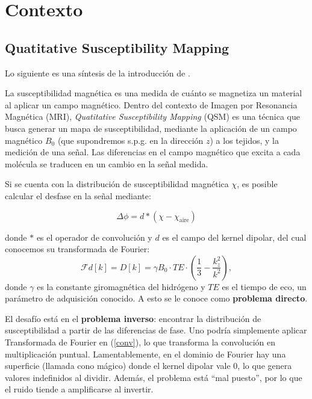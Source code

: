 \newpage

\section{Contexto}


\subsection{Quatitative Susceptibility Mapping}

Lo siguiente es una síntesis de la introducción de \cite{tesis}.

La susceptibilidad magnética es una medida de cuánto se magnetiza un material al aplicar un campo magnético. Dentro del contexto de Imagen por Resonancia Magnética (MRI), \textit{Quatitative Susceptibility Mapping} (QSM) es una técnica que busca generar un mapa de susceptibilidad, mediante la aplicación de un campo magnético $B_0$ (que supondremos s.p.g. en la dirección $z$) a los tejidos, y la medición de una señal. Las diferencias en el campo magnético que excita a cada molécula se traducen en un cambio en la señal medida.

Si se cuenta con la distribución de susceptibilidad magnética $\chi$, es posible calcular el desfase en la señal mediante:

\begin{equation}\label{conv}
\Delta \phi = d * (\chi-\chi_{\text{aire}})
\end{equation}

donde $*$ es el operador de convolución y $d$ es el campo del kernel dipolar, del cual conocemos su transformada de Fourier:
$$
\mathcal{F}d[k] = D[k] =  \gamma B_0 \cdot TE \cdot \left( \frac{1}{3} - \frac{k_z^2}{k^2}\right),
$$
donde $\gamma$ es la constante giromagnética del hidrógeno y $TE$ es el tiempo de eco, un parámetro de adquisición conocido. A esto se le conoce como \textbf{problema directo}.

El desafío está en el \textbf{problema inverso}: encontrar la distribución de susceptibilidad a partir de las diferencias de fase. Uno podría simplemente aplicar Transformada de Fourier en (\ref{conv}), lo que transforma la convolución en multiplicación puntual. Lamentablemente, en el dominio de Fourier hay una superficie  (llamada cono mágico) donde el kernel dipolar vale $0$, lo que genera valores indefinidos al dividir. Además, el problema está ``mal puesto'', por lo que el ruido tiende a amplificarse al invertir.

